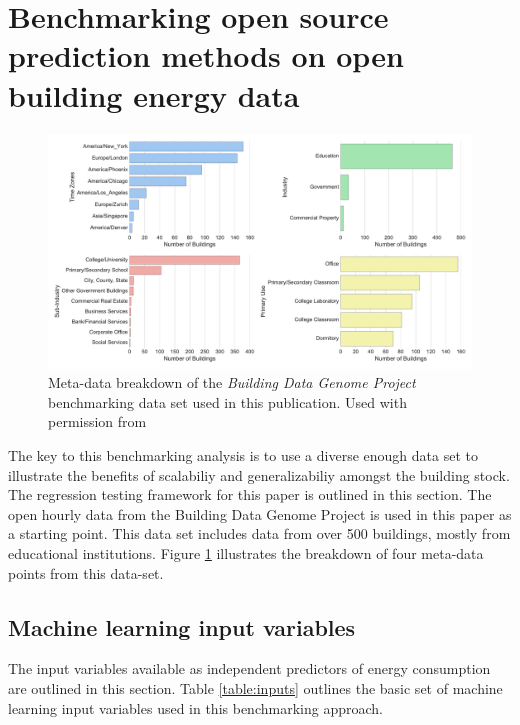 \documentclass[preprint,12pt]{elsarticle}
\begin{document}

\section{Benchmarking open source prediction methods on open building energy data}
\label{sec:frameworkforanalysis}

\begin{figure}[ht!]
\begin{center}
\includegraphics[width=1\columnwidth]{figures/allbars.pdf}
\caption{Meta-data breakdown of the \emph{Building Data Genome Project} benchmarking data set used in this publication. Used with permission from \cite{Miller2017a}}
\label{fig:bdg_meta}%
\end{center}
\end{figure}


The key to this benchmarking analysis is to use a diverse enough data set to illustrate the benefits of scalabiliy and generalizabiliy amongst the building stock. The regression testing framework for this paper is outlined in this section. The open hourly data from the Building Data Genome Project is used in this paper as a starting point. This data set includes data from over 500 buildings, mostly from educational institutions. Figure \ref{fig:bdg_meta} illustrates the breakdown of four meta-data points from this data-set.

\subsection{Machine learning input variables}
\label{sec:variables}
The input variables available as independent predictors of energy consumption are outlined in this section. Table \ref{table:inputs} outlines the basic set of machine learning input variables used in this benchmarking approach. 
\end{document}

